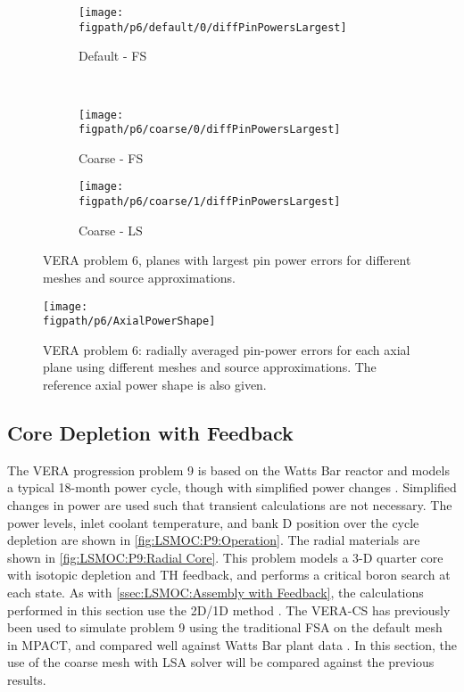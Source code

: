 {{{      \begin{figure}[htbp]
        \centering
        \begin{subfigure}[t]{0.49\textwidth}
          \centering
          \texttt{[image: \\figpath/p6/default/0/diffPinPowersLargest]}
          \caption{Default - FS\label{fig:LSMOC:P6:Default-FS:LargestPinPowerErrors}}
        \end{subfigure}%
        ~
        \begin{subfigure}[t]{0.49\textwidth}
          \centering
          \texttt{[image: \\figpath/p6/coarse/0/diffPinPowersLargest]}
          \caption{Coarse - FS\label{fig:LSMOC:P6:Coarse-FS:LargestPinPowerErrors}}
        \end{subfigure}
        \begin{subfigure}[t]{0.49\textwidth}
          \centering
          \texttt{[image: \\figpath/p6/coarse/1/diffPinPowersLargest]}
          \caption{Coarse - LS\label{fig:LSMOC:P6:Coarse-LS:LargestPinPowerErrors}}
        \end{subfigure}
        \caption{VERA problem 6, planes with largest pin power errors for different meshes and source approximations.}
        \label{figs:LSMOC:P6:LargestPinPowerErrors}
      \end{figure}

      \begin{figure}[htbp]
        \centering
        \texttt{[image: \\figpath/p6/AxialPowerShape]}
        \caption{VERA problem 6: radially averaged pin-power errors for each axial plane using different meshes and source approximations.
                 The reference axial power shape is also given. \label{fig:LSMOC:P6:AxialPowerShape}}
      \end{figure}
    }

    \subsection{Core Depletion with Feedback}{\label{ssec:LSMOC:Core Depletion with Feedback}
      The \ac{VERA} progression problem 9 is based on the Watts Bar reactor and models a typical 18-month power cycle, though with simplified power changes \cite{VERA,VERAProblems}.
      Simplified changes in power are used such that transient calculations are not necessary.
      The power levels, inlet coolant temperature, and bank D position over the cycle depletion are shown in \cref{fig:LSMOC:P9:Operation}.
      The radial materials are shown in \cref{fig:LSMOC:P9:Radial Core}.
      This problem models a 3-D quarter core with isotopic depletion and \ac{TH} feedback, and performs a critical boron search at each state.
      As with \cref{ssec:LSMOC:Assembly with Feedback}, the calculations performed in this section use the 2D/1D method \cite{Collins2016,VERA}.
      The \ac{VERA-CS} has previously been used to simulate problem 9 using the traditional \ac{FSA} on the default mesh in MPACT, and compared well against Watts Bar plant data \cite{VERA}.
      In this section, the use of the coarse mesh with \ac{LSA} solver will be compared against the previous results.

}}}
